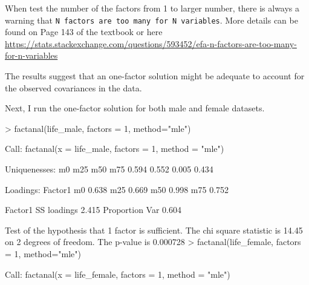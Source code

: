 \documentclass[
]{article}
\newenvironment{Shaded}{\begin{snugshade}}{\end{snugshade}}
\newcommand{\AttributeTok}[1]{\textcolor[rgb]{0.77,0.63,0.00}{#1}}
\newcommand{\DecValTok}[1]{\textcolor[rgb]{0.00,0.00,0.81}{#1}}
\newcommand{\FloatTok}[1]{\textcolor[rgb]{0.00,0.00,0.81}{#1}}
\newcommand{\FunctionTok}[1]{\textcolor[rgb]{0.00,0.00,0.00}{#1}}
\newcommand{\NormalTok}[1]{#1}
\newcommand{\SpecialCharTok}[1]{\textcolor[rgb]{0.00,0.00,0.00}{#1}}
\newcommand{\StringTok}[1]{\textcolor[rgb]{0.31,0.60,0.02}{#1}}
\begin{document}
When test the number of the factors from 1 to larger number, there is
always a warning that
\texttt{N\ factors\ are\ too\ many\ for\ N\ variables}. More details can
be found on Page 143 of the textbook or here
\url{https://stats.stackexchange.com/questions/593452/efa-n-factors-are-too-many-for-n-variables}

The results suggest that an one-factor solution might be adequate to
account for the observed covariances in the data.

Next, I run the one-factor solution for both male and female datasets.

\begin{Shaded}
\begin{Highlighting}[]
\SpecialCharTok{\textgreater{}} \FunctionTok{factanal}\NormalTok{(life\_male, }\AttributeTok{factors =} \DecValTok{1}\NormalTok{, }\AttributeTok{method=}\StringTok{"mle"}\NormalTok{)}

\NormalTok{Call}\SpecialCharTok{:}
\FunctionTok{factanal}\NormalTok{(}\AttributeTok{x =}\NormalTok{ life\_male, }\AttributeTok{factors =} \DecValTok{1}\NormalTok{, }\AttributeTok{method =} \StringTok{"mle"}\NormalTok{)}

\NormalTok{Uniquenesses}\SpecialCharTok{:}
\NormalTok{   m0   m25   m50   m75 }
\FloatTok{0.594} \FloatTok{0.552} \FloatTok{0.005} \FloatTok{0.434} 

\NormalTok{Loadings}\SpecialCharTok{:}
\NormalTok{    Factor1}
\NormalTok{m0  }\FloatTok{0.638}  
\NormalTok{m25 }\FloatTok{0.669}  
\NormalTok{m50 }\FloatTok{0.998}  
\NormalTok{m75 }\FloatTok{0.752}  

\NormalTok{               Factor1}
\NormalTok{SS loadings      }\FloatTok{2.415}
\NormalTok{Proportion Var   }\FloatTok{0.604}

\NormalTok{Test of the hypothesis that }\DecValTok{1}\NormalTok{ factor is sufficient.}
\NormalTok{The chi square statistic is }\FloatTok{14.45}\NormalTok{ on }\DecValTok{2}\NormalTok{ degrees of freedom.}
\NormalTok{The p}\SpecialCharTok{{-}}\NormalTok{value is }\FloatTok{0.000728} 
\SpecialCharTok{\textgreater{}} \FunctionTok{factanal}\NormalTok{(life\_female, }\AttributeTok{factors =} \DecValTok{1}\NormalTok{, }\AttributeTok{method=}\StringTok{"mle"}\NormalTok{)}

\NormalTok{Call}\SpecialCharTok{:}
\FunctionTok{factanal}\NormalTok{(}\AttributeTok{x =}\NormalTok{ life\_female, }\AttributeTok{factors =} \DecValTok{1}\NormalTok{, }\AttributeTok{method =} \StringTok{"mle"}\NormalTok{)}


\end{Highlighting}
\end{Shaded}
\end{document}
